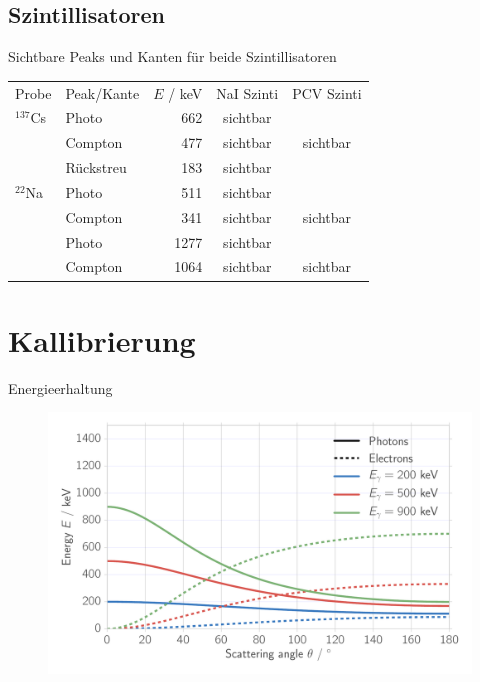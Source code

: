 \documentclass[xcolor=x11names,compress]{beamer}
\renewcommand{\(}{\begin{columns}}
\renewcommand{\)}{\end{columns}}
\newcommand{\<}[1]{\begin{column}{#1}}
\renewcommand{\>}{\end{column}}
\begin{document}
\subsection{Szintillisatoren}
\begin{frame}[t]{Sichtbare Peaks und Kanten für beide Szintillisatoren}
\begin{table}[htpb]
    \centering
    \label{tab:mono_calibration}
    \begin{tabular}{l l r c c}
        \rowcolor{LightCyan} Probe & Peak/Kante & $E$ / keV& NaI Szinti & PCV Szinti \\
        \cellcolor{LightCyan}$^{137}$Cs & Photo & 662 & sichtbar &  \\
        \cellcolor{LightCyan} & Compton& 477& sichtbar  &  sichtbar  \\
        \cellcolor{LightCyan} & Rückstreu& 183&  sichtbar &  \\
        \cellcolor{LightCyan}$^{22}$Na & Photo& 511& sichtbar  &  \\
        \cellcolor{LightCyan} & Compton& 341& sichtbar  & sichtbar  \\
        \cellcolor{LightCyan} & Photo& 1277& sichtbar  & \\
        \cellcolor{LightCyan} & Compton& 1064& sichtbar  & sichtbar \\
    \end{tabular}
\end{table}
\end{frame}


\section{Kallibrierung}
\begin{frame}[t]{Energieerhaltung}
\begin{figure}[htpb]
    \centering
    \includegraphics[width=1.0\linewidth]{../analysis/figures/theory_conservation}
\label{fig:theory_cons}
\end{figure}
\end{frame}
\end{document}
